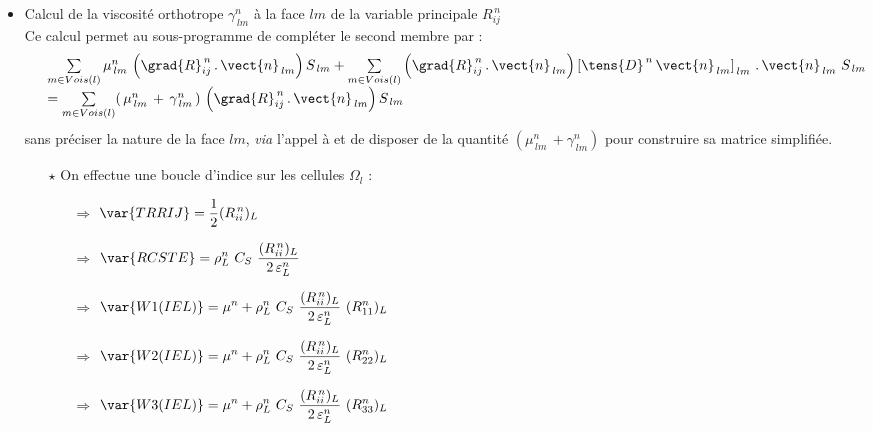 \begin{itemize}
\begin{itemize}
Le r\'esultat est stock\'e dans le tableau .\\
Ajout au second membre .\\
$\var{SMBR} = \var{SMBR} + \var{W1}$
\end{itemize}
\item Calcul de la viscosit\'e orthotrope $\gamma^n_{\,lm}$ \`a la face $lm$ de la variable principale
$R^{\,n}_{ij}$\\
Ce calcul permet au sous-programme  de compl\'eter le second membre
 par :
\begin{equation}
\begin{array} {ll}
& \sum\limits_{m\in Vois(l)}
\mu^n_{\,lm}\,\left(\grad{R}^{\,n}_{ij}\,.\,\vect{n}_{\,lm}\right)S_{\,lm}
 + \sum\limits_{m\in Vois(l)} \left(\grad{R}^{\,n}_{ij}
\,.\,\vect{n}_{\,lm}\right)\left[\tens{D}^{\,n}\,\vect{n}_{\,lm}\right]_{\,lm}\,.\,\vect{n}_{\,lm}\
S_{\,lm}\\
& = \sum\limits_{m\in Vois(l)}(\,\mu^n_{\,lm}\, + \,\gamma^n_{\,lm}\,)\,\left(\grad{R}^{\,n}_{ij}\,.\,\vect{n}_{\,lm}\right)S_{\,lm}
\end{array}
\end{equation}
sans pr\'eciser la nature de la face $lm$, {\it via} l'appel \`a   et de disposer de la quantit\'e
$(\mu^n_{\,lm}\, + \gamma^n_{\,lm})$ pour construire sa
matrice simplifi\'ee.\\
\begin{itemize}
\item [$\star$] On effectue une boucle d'indice  sur les cellules
$\Omega_l$ :
\begin{itemize}
\item [$\Rightarrow$] $\displaystyle \var{TRRIJ }= \frac{1}{2} (R^{\,n}_{ii})_L $
\item [$\Rightarrow$] $\displaystyle \var{RCSTE} = \rho^n_L \ C_S \ \frac{ (R^{\,n}_{ii})_L}{2\,\varepsilon^n_L} $
\item [$\Rightarrow$] $\displaystyle \var{W1(IEL)} = \mu^n +\rho^n_L \ C_S \ \frac{
(R^{\,n}_{ii})_L}{2\,\varepsilon^n_L}\ (R^n_{11})_L$
\item [$\Rightarrow$] $\displaystyle \var{W2(IEL)} = \mu^n + \rho^n_L \ C_S \ \frac{ (R^{\,n}_{ii})_L}{2\,\varepsilon^n_L}\ (R^n_{22})_L$
\item [$\Rightarrow$] $\displaystyle \var{W3(IEL)} = \mu^n + \rho^n_L \ C_S \ \frac{ (R^{\,n}_{ii})_L}{2\,\varepsilon^n_L}\ (R^n_{33})_L$
\end{itemize}


\end{itemize}
\end{itemize}
